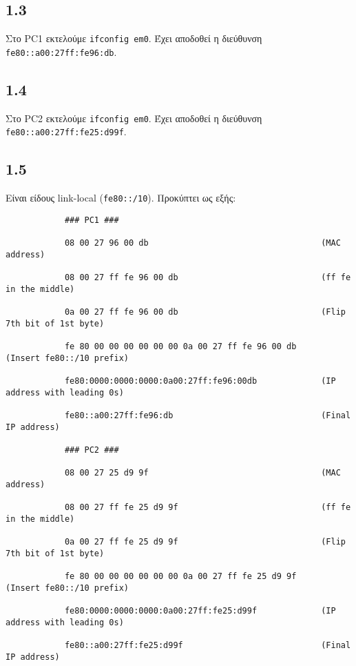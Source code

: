 \documentclass[a4paper, 12pt]{article}
\begin{document}
	\subsection*{1.3}
		Στο PC1 εκτελούμε \verb|ifconfig em0|. Έχει αποδοθεί η διεύθυνση \verb|fe80::a00:27ff:fe96:db|.

	\subsection*{1.4}
		Στο PC2 εκτελούμε \verb|ifconfig em0|. Έχει αποδοθεί η διεύθυνση \verb|fe80::a00:27ff:fe25:d99f|.

	\subsection*{1.5}
		Είναι είδους link-local (\verb|fe80::/10|). Προκύπτει ως εξής:
		
		\begin{verbatim}
			### PC1 ###
						
			08 00 27 96 00 db                                   (MAC address)
			
			08 00 27 ff fe 96 00 db                             (ff fe in the middle)
			
			0a 00 27 ff fe 96 00 db                             (Flip 7th bit of 1st byte)
			
			fe 80 00 00 00 00 00 00 0a 00 27 ff fe 96 00 db     (Insert fe80::/10 prefix)
			
			fe80:0000:0000:0000:0a00:27ff:fe96:00db             (IP address with leading 0s)
			
			fe80::a00:27ff:fe96:db                              (Final IP address)
			
			### PC2 ###
						
			08 00 27 25 d9 9f                                   (MAC address)
			
			08 00 27 ff fe 25 d9 9f                             (ff fe in the middle)
			
			0a 00 27 ff fe 25 d9 9f                             (Flip 7th bit of 1st byte)
			
			fe 80 00 00 00 00 00 00 0a 00 27 ff fe 25 d9 9f     (Insert fe80::/10 prefix)
			
			fe80:0000:0000:0000:0a00:27ff:fe25:d99f             (IP address with leading 0s)
			
			fe80::a00:27ff:fe25:d99f                            (Final IP address)
		\end{verbatim}
\end{document}

